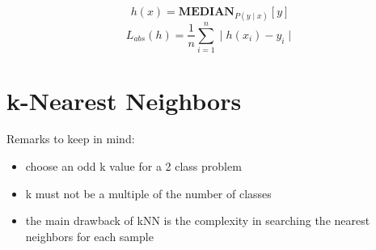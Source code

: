 \documentclass{article}
\begin{document}
\begin{enumerate}
            \begin{equation}
                h(x) = \textbf{MEDIAN}_{P(y\mid x)}[y]
            \end{equation}
            \begin{equation}
                L_{abs}(h) = \frac{1}{n} \sum_{i=1}^{n} \mid h(x_i)-y_{i} \mid
            \end{equation}
    \end{enumerate}
    
\section{k-Nearest Neighbors}
    Remarks to keep in mind:
    \begin{itemize}
        \item 
            choose an odd k value for a 2 class problem
            
        \item
            k must not be a multiple of the number of classes
            
        \item
            the main drawback of kNN is the complexity in searching the nearest neighbors for each sample
    \end{itemize} 
    
\end{document}
